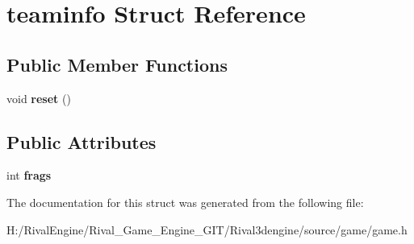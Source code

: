 \hypertarget{structteaminfo}{}\section{teaminfo Struct Reference}
\label{structteaminfo}
\subsection*{Public Member Functions}
\begin{DoxyCompactItemize}
\item 
\mbox{\label{structteaminfo_aef64f606e2d329654dcba0263b053913}} 
void {\bfseries reset} ()
\end{DoxyCompactItemize}
\subsection*{Public Attributes}
\begin{DoxyCompactItemize}
\item 
\mbox{\label{structteaminfo_af0df4b8109972a28007cd908d3241b20}} 
int {\bfseries frags}
\end{DoxyCompactItemize}


The documentation for this struct was generated from the following file\+:\begin{DoxyCompactItemize}
\item 
H\+:/\+Rival\+Engine/\+Rival\+\_\+\+Game\+\_\+\+Engine\+\_\+\+G\+I\+T/\+Rival3dengine/source/game/game.\+h\end{DoxyCompactItemize}
